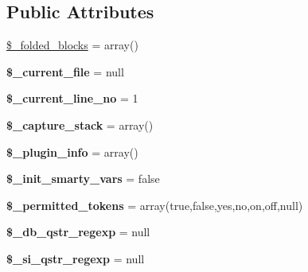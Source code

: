 \subsection*{Public Attributes}
\begin{DoxyCompactItemize}
\item 
\mbox{\hyperlink{class_smarty___compiler_a1e5cff1844f9c58d4e83ba2abc0dfa72}{\$\+\_\+folded\+\_\+blocks}} = array()
\item 
\mbox{\label{class_smarty___compiler_a04cecf3d9254b649ff8137d450e51134}} 
{\bfseries \$\+\_\+current\+\_\+file} = null
\item 
\mbox{\label{class_smarty___compiler_a60041715a86f820d7b8a755951730940}} 
{\bfseries \$\+\_\+current\+\_\+line\+\_\+no} = 1
\item 
\mbox{\label{class_smarty___compiler_ad4f48c151feff38d6e840a0c1d7a4ef8}} 
{\bfseries \$\+\_\+capture\+\_\+stack} = array()
\item 
\mbox{\label{class_smarty___compiler_abacc3e4d9217debfd6b03ba0e317f911}} 
{\bfseries \$\+\_\+plugin\+\_\+info} = array()
\item 
\mbox{\label{class_smarty___compiler_aec4c0c589eadfe50758dbcfbdc3e2c5e}} 
{\bfseries \$\+\_\+init\+\_\+smarty\+\_\+vars} = false
\item 
\mbox{\label{class_smarty___compiler_ac8a47908cdccbc1ed8b923c8deb6bb9e}} 
{\bfseries \$\+\_\+permitted\+\_\+tokens} = array(\textquotesingle{}true\textquotesingle{},\textquotesingle{}false\textquotesingle{},\textquotesingle{}yes\textquotesingle{},\textquotesingle{}no\textquotesingle{},\textquotesingle{}on\textquotesingle{},\textquotesingle{}off\textquotesingle{},\textquotesingle{}null\textquotesingle{})
\item 
\mbox{\label{class_smarty___compiler_a5604ede80d8e0887e377f1dfbc2c05d9}} 
{\bfseries \$\+\_\+db\+\_\+qstr\+\_\+regexp} = null
\item 
\mbox{\label{class_smarty___compiler_afcbafe14268e79999c245c0181d84ee5}} 
{\bfseries \$\+\_\+si\+\_\+qstr\+\_\+regexp} = null

\end{DoxyCompactItemize}
